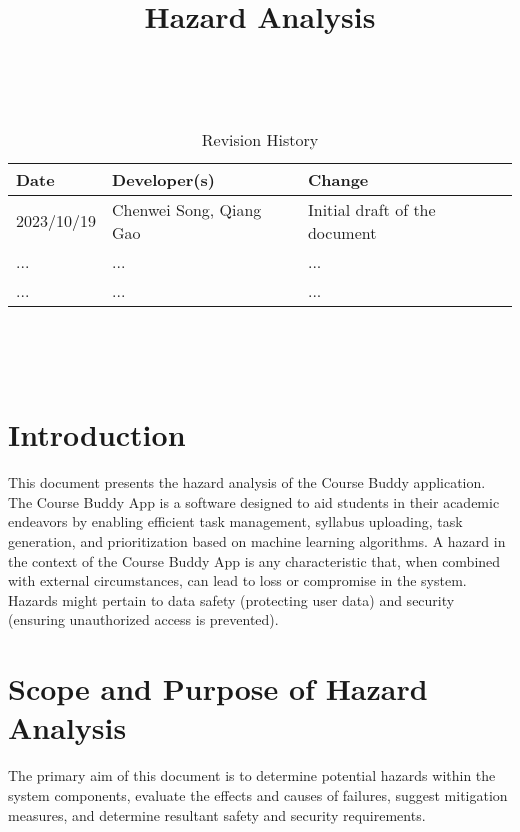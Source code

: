 \documentclass{article}
\title{Hazard Analysis\\\progname}
\author{\authname}
\date{}
\begin{document}
\maketitle
\thispagestyle{empty}

~\newpage


\begin{table}[hp]
\caption{Revision History} \label{TblRevisionHistory}
\begin{tabularx}{\textwidth}{llX}
\toprule
\textbf{Date} & \textbf{Developer(s)} & \textbf{Change}\\
\midrule
2023/10/19 & Chenwei Song, Qiang Gao  & Initial draft of the document\\
... & ... & ...\\
... & ... & ...\\
\bottomrule
\end{tabularx}
\end{table}

~\newpage

\tableofcontents

~\newpage



\section{Introduction}
This document presents the hazard analysis of the Course Buddy application. The Course Buddy App is a software designed to aid students in their academic endeavors by enabling efficient task management, syllabus uploading, task generation, and prioritization based on machine learning algorithms.
A hazard in the context of the Course Buddy App is any characteristic that, when combined with external circumstances, can lead to loss or compromise in the system. Hazards might pertain to data safety (protecting user data) and security (ensuring unauthorized access is prevented).

\section{Scope and Purpose of Hazard Analysis}
The primary aim of this document is to determine potential hazards within the system components, evaluate the effects and causes of failures, suggest mitigation measures, and determine resultant safety and security requirements.
\end{document}
